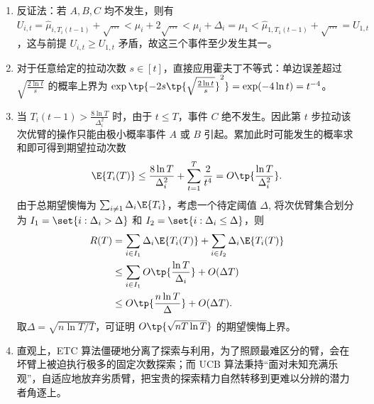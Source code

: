 \begin{solution}
    \begin{enumerate}
        \item 反证法：若 $A, B, C$ 均不发生，则有 $U_{i,t} = \hat{\mu}_{i, T_i(t-1)} + \sqrt{\dots} < \mu_i + 2\sqrt{\dots} < \mu_i + \Delta_i = \mu_1 < \hat{\mu}_{1, T_1(t-1)} + \sqrt{\dots} = U_{1,t}$，这与前提 $U_{i,t} \ge U_{1,t}$ 矛盾，故这三个事件至少发生其一。
        \item 对于任意给定的拉动次数 $s \in [t]$，直接应用霍夫丁不等式：单边误差超过 $\sqrt{\frac{2\ln t}{s}}$ 的概率上界为 $\exp\tp{-2 s \tp{\sqrt{\frac{2\ln t}{s}}}^2} = \exp(-4\ln t) = t^{-4}$。
        \item 当 $T_i(t-1) > \frac{8\ln T}{\Delta_i^2}$ 时，由于 $t \le T$，事件 $C$ 绝不发生。因此第 $t$ 步拉动该次优臂的操作只能由极小概率事件 $A$ 或 $B$ 引起。累加此时可能发生的概率求和即可得到期望拉动次数 \[
        \E{T_i(T)} \le \frac{8\ln T}{\Delta_i^2} + \sum_{t=1}^T \frac{2}{t^4} = O\tp{\frac{\ln T}{\Delta_i^2}}.
        \]
        由于总期望懊悔为 $\sum_{i\ne 1}\Delta_i \E{T_i}$，考虑一个待定阈值 $\Delta$, 将次优臂集合划分为 $I_1 = \set{i: \Delta_i > \Delta}$ 和 $I_2 = \set{i: \Delta_i \le \Delta}$，则
        \begin{align*}
            R(T) &= \sum_{i \in I_1} \Delta_i \E{T_i(T)} + \sum_{i \in I_2} \Delta_i \E{T_i(T)}\\
            &\le \sum_{i \in I_1} O\tp{\frac{\ln T}{\Delta_i}} + O(\Delta T)\\
            &\le O\tp{\frac{n\ln T}{\Delta}} + O(\Delta T).
        \end{align*}
        取$\Delta = \sqrt{n\ln T / T}$，可证明 $O\tp{\sqrt{nT\ln T}}$ 的期望懊悔上界。
        \item 直观上，ETC 算法僵硬地分离了探索与利用，为了照顾最难区分的臂，会在坏臂上被迫执行极多的固定次数探索；而 UCB 算法秉持“面对未知充满乐观”，自适应地放弃劣质臂，把宝贵的探索精力自然转移到更难以分辨的潜力者角逐上。
    \end{enumerate}
\end{solution}

